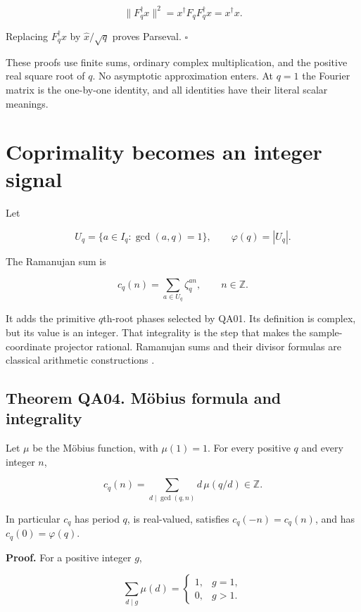 \[
\|F_q^\dagger x\|^2
=x^\dagger F_qF_q^\dagger x
=x^\dagger x.
\]

Replacing \(F_q^\dagger x\) by \(\widehat{x}/\sqrt q\) proves Parseval.
\(\square\)

These proofs use finite sums, ordinary complex multiplication, and the
positive real square root of \(q\). No asymptotic approximation enters.
At \(q=1\) the Fourier matrix is the one-by-one identity, and all
identities have their literal scalar meanings.

\hypertarget{coprimality-becomes-an-integer-signal}{%
\section{Coprimality becomes an integer
signal}\label{coprimality-becomes-an-integer-signal}}

Let

\[
U_q=\{a\in I_q:\gcd(a,q)=1\},
\qquad \varphi(q)=|U_q|.
\]

The Ramanujan sum is

\[
c_q(n)=\sum_{a\in U_q}\zeta_q^{an},
\qquad n\in\mathbb Z.
\]

It adds the primitive \(q\)th-root phases selected by QA01. Its
definition is complex, but its value is an integer. That integrality is
the step that makes the sample-coordinate projector rational. Ramanujan
sums and their divisor formulas are classical arithmetic constructions
\cite{Ramanujan1918}.

\hypertarget{theorem-qa04.-muxf6bius-formula-and-integrality}{%
\subsection*{Theorem QA04. Möbius formula and
integrality}\label{theorem-qa04.-muxf6bius-formula-and-integrality}}

Let \(\mu\) be the Möbius function, with \(\mu(1)=1\). For every
positive \(q\) and every integer \(n\),

\[
\boxed{c_q(n)=\sum_{d\mid\gcd(q,n)}d\,\mu(q/d)\in\mathbb Z.}
\]

In particular \(c_q\) has period \(q\), is real-valued, satisfies
\(c_q(-n)=c_q(n)\), and has \(c_q(0)=\varphi(q)\).

\textbf{Proof.} For a positive integer \(g\),

\[
\sum_{d\mid g}\mu(d)
=\begin{cases}1,&g=1,\\0,&g>1.\end{cases}
\]

